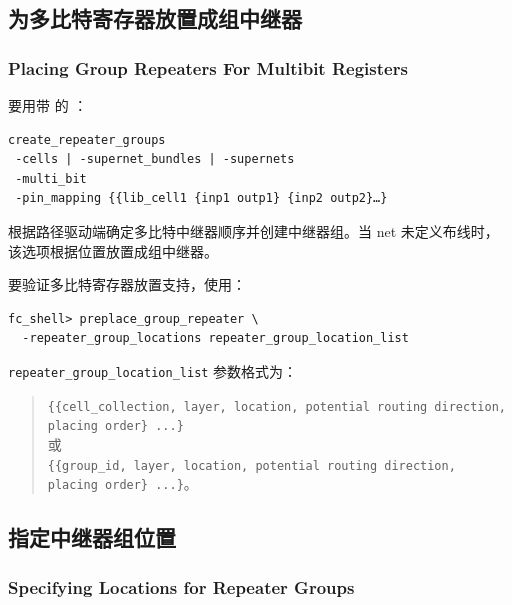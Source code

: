 \subsection{为多比特寄存器放置成组中继器}
\subsubsection*{Placing Group Repeaters For Multibit Registers}

要用带  的 ：
\begin{lstlisting}
create_repeater_groups
 -cells | -supernet_bundles | -supernets
 -multi_bit
 -pin_mapping {{lib_cell1 {inp1 outp1} {inp2 outp2}…}
\end{lstlisting}

 根据路径驱动端确定多比特中继器顺序并创建中继器组。当 net 未定义布线时，该选项根据位置放置成组中继器。

要验证多比特寄存器放置支持，使用：
\begin{lstlisting}
fc_shell> preplace_group_repeater \
  -repeater_group_locations repeater_group_location_list
\end{lstlisting}

\texttt{repeater\_group\_location\_list} 参数格式为：
\begin{quote}
\texttt{\{\{cell\_collection, layer, location, potential routing direction, placing order\} ...\}}\\
或\\
\texttt{\{\{group\_id, layer, location, potential routing direction, placing order\} ...\}}。
\end{quote}

\subsection{指定中继器组位置}
\subsubsection*{Specifying Locations for Repeater Groups}

